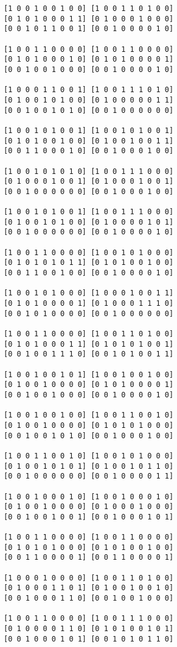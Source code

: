 \begin{lstlisting}
[1 0 0 1 0 0 1 0 0] [1 0 0 1 1 0 1 0 0] 
[0 1 0 1 0 0 0 1 1] [0 1 0 0 0 1 0 0 0] 
[0 0 1 0 1 1 0 0 1] [0 0 1 0 0 0 0 1 0] 

[1 0 0 1 1 0 0 0 0] [1 0 0 1 1 0 0 0 0] 
[0 1 0 1 0 0 0 1 0] [0 1 0 1 0 0 0 0 1] 
[0 0 1 0 0 1 0 0 0] [0 0 1 0 0 0 0 1 0] 

[1 0 0 0 1 1 0 0 1] [1 0 0 1 1 1 0 1 0] 
[0 1 0 0 1 0 1 0 0] [0 1 0 0 0 0 0 1 1] 
[0 0 1 0 0 1 0 1 0] [0 0 1 0 0 0 0 0 0] 

[1 0 0 1 0 1 0 0 1] [1 0 0 1 0 1 0 0 1] 
[0 1 0 1 0 0 1 0 0] [0 1 0 0 1 0 0 1 1] 
[0 0 1 1 0 0 0 1 0] [0 0 1 0 0 0 1 0 0] 

[1 0 0 1 0 1 0 1 0] [1 0 0 1 1 1 0 0 0] 
[0 1 0 0 0 1 0 0 1] [0 1 0 0 0 1 0 0 1] 
[0 0 1 0 0 0 0 0 0] [0 0 1 0 0 0 1 0 0] 

[1 0 0 1 0 1 0 0 1] [1 0 0 1 1 1 0 0 0] 
[0 1 0 0 1 0 1 0 0] [0 1 0 0 0 0 1 0 1] 
[0 0 1 0 0 0 0 0 0] [0 0 1 0 0 0 0 1 0] 

[1 0 0 1 1 0 0 0 0] [1 0 0 1 0 1 0 0 0] 
[0 1 0 1 0 1 0 1 1] [0 1 0 1 0 0 1 0 0] 
[0 0 1 1 0 0 1 0 0] [0 0 1 0 0 0 0 1 0] 

[1 0 0 1 0 1 0 0 0] [1 0 0 0 1 0 0 1 1] 
[0 1 0 1 0 0 0 0 1] [0 1 0 0 0 1 1 1 0] 
[0 0 1 0 1 0 0 0 0] [0 0 1 0 0 0 0 0 0] 

[1 0 0 1 1 0 0 0 0] [1 0 0 1 1 0 1 0 0] 
[0 1 0 1 0 0 0 1 1] [0 1 0 1 0 1 0 0 1] 
[0 0 1 0 0 1 1 1 0] [0 0 1 0 1 0 0 1 1] 

[1 0 0 1 0 0 1 0 1] [1 0 0 1 0 0 1 0 0] 
[0 1 0 0 1 0 0 0 0] [0 1 0 1 0 0 0 0 1] 
[0 0 1 0 0 1 0 0 0] [0 0 1 0 0 0 0 1 0] 

[1 0 0 1 0 0 1 0 0] [1 0 0 1 1 0 0 1 0] 
[0 1 0 0 1 0 0 0 0] [0 1 0 1 0 1 0 0 0] 
[0 0 1 0 0 1 0 1 0] [0 0 1 0 0 0 1 0 0] 

[1 0 0 1 1 0 0 1 0] [1 0 0 1 0 1 0 0 0] 
[0 1 0 0 1 0 1 0 1] [0 1 0 0 1 0 1 1 0] 
[0 0 1 0 0 0 0 0 0] [0 0 1 0 0 0 0 1 1] 

[1 0 0 1 0 0 0 1 0] [1 0 0 1 0 0 0 1 0] 
[0 1 0 0 1 0 0 0 0] [0 1 0 0 0 1 0 0 0] 
[0 0 1 0 0 1 0 0 1] [0 0 1 0 0 0 1 0 1] 

[1 0 0 1 1 0 0 0 0] [1 0 0 1 1 0 0 0 0] 
[0 1 0 1 0 1 0 0 0] [0 1 0 1 0 0 1 0 0] 
[0 0 1 1 0 0 0 0 1] [0 0 1 1 0 0 0 0 1] 

[1 0 0 0 1 0 0 0 0] [1 0 0 1 1 0 1 0 0] 
[0 1 0 0 0 1 1 0 1] [0 1 0 0 1 0 0 1 0] 
[0 0 1 0 0 0 1 1 0] [0 0 1 0 0 1 0 0 0] 

[1 0 0 1 1 0 0 0 0] [1 0 0 1 1 1 0 0 0] 
[0 1 0 0 0 0 1 1 0] [0 1 0 1 0 0 1 0 1] 
[0 0 1 0 0 0 1 0 1] [0 0 1 0 1 0 1 1 0] 


\end{lstlisting}
